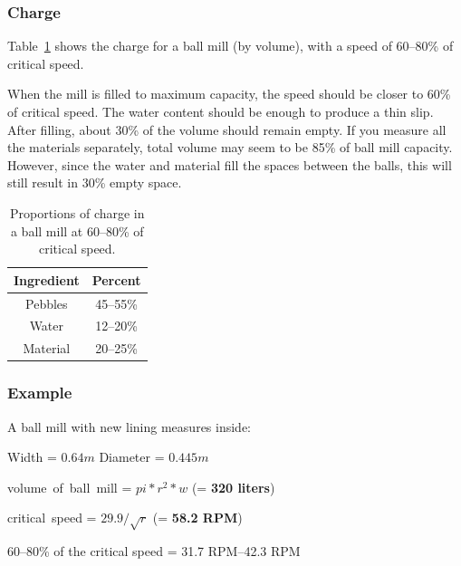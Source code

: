 \subsubsection{Charge}
Table~\ref{tab:charge} shows the charge for a ball mill (by volume), with a 
speed of 60--80\% of critical speed.

When the mill is filled to maximum capacity, the speed should be closer to 60\% 
of critical speed. The water content should be enough to produce a thin slip. 
After filling, about 30\% of the volume should remain empty. If you measure all 
the materials separately, total volume may seem to be 85\% of ball mill 
capacity. However, since the water and material fill the spaces between the 
balls, this will still result in 30\% empty space.
\begin{center}
          \renewcommand{\arraystretch}{1.5}
  \begin{table}\centering
    \begin{tabular}{|c|c|}\hline
      \textbf{Ingredient}&\textbf{Percent}\\\hline\hline
      Pebbles&45--55\%\\\hline
      Water&12--20\%\\\hline
      Material&20--25\%\\\hline
    \end{tabular}
    \caption{Proportions of charge in a ball mill at 60--80\% of critical 
      speed.}
    \label{tab:charge}
  \end{table}
\end{center}
\subsubsection{Example}
A ball mill with new lining measures inside:

Width = $0.64 m$ 
Diameter = $0.445 m$

volume~of~ball~mill = $pi * r^2 * w$ (= \textbf{320 liters})

critical~speed = $29.9 / \sqrt{r}$ (= \textbf{58.2 RPM})

60--80\% of the critical speed = 31.7 RPM--42.3 RPM

